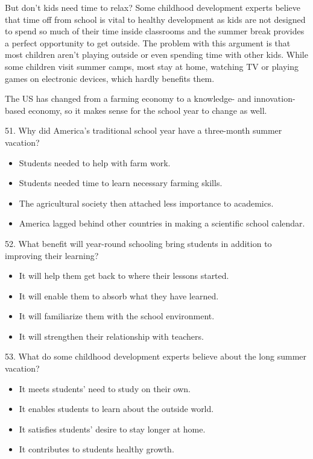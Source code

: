 \documentclass[UTF8,11pt]{ctexart}
\begin{document}
But don’t kids need time to relax? Some childhood development experts believe that time off from school is vital to healthy development as kids are not designed to spend so much of their time inside classrooms and the summer break provides a perfect opportunity to get outside. The problem with this argument is that most children aren’t playing outside or even spending time with other kids. While some children visit summer camps, most stay at home, watching TV or playing games on electronic devices, which hardly benefits them.


The US has changed from a farming economy to a knowledge- and innovation-based economy, so it makes sense for the school year to change as well.


51. Why did America’s traditional school year have a three-month summer vacation?


\begin{itemize}[leftmargin=2em,itemsep=.2em,topsep=.4em]\item[A.] Students needed to help with farm work.
\item[B.] Students needed time to learn necessary farming skills.
\item[C.] The agricultural society then attached less importance to academics.
\item[D.] America lagged behind other countries in making a scientific school calendar.
\end{itemize}

52. What benefit will year-round schooling bring students in addition to improving their learning?


\begin{itemize}[leftmargin=2em,itemsep=.2em,topsep=.4em]\item[A.] It will help them get back to where their lessons started.
\item[B.] It will enable them to absorb what they have learned.
\item[C.] It will familiarize them with the school environment.
\item[D.] It will strengthen their relationship with teachers.
\end{itemize}

53. What do some childhood development experts believe about the long summer vacation?


\begin{itemize}[leftmargin=2em,itemsep=.2em,topsep=.4em]\item[A.] It meets students’ need to study on their own.
\item[B.] It enables students to learn about the outside world.
\item[C.] It satisfies students’ desire to stay longer at home.
\item[D.] It contributes to students healthy growth.
\end{itemize}
\end{document}
